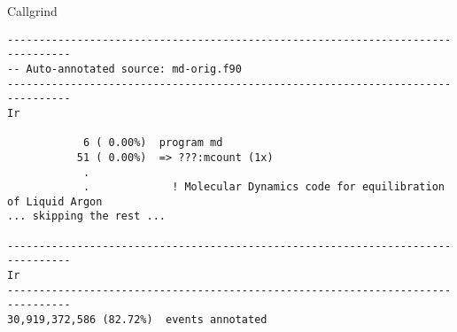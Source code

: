 \documentclass[10pt,t]{beamer}
\begin{document}
\begin{frame}{Callgrind}
\begin{itemize}
\begin{lstlisting}[basicstyle=\fontsize{4.5}{5.5}\selectfont\ttfamily]
--------------------------------------------------------------------------------
-- Auto-annotated source: md-orig.f90
--------------------------------------------------------------------------------
Ir

            6 ( 0.00%)  program md
           51 ( 0.00%)  => ???:mcount (1x)
            .
            .             ! Molecular Dynamics code for equilibration of Liquid Argon
... skipping the rest ...

--------------------------------------------------------------------------------
Ir
--------------------------------------------------------------------------------
30,919,372,586 (82.72%)  events annotated

        \end{lstlisting}
  \end{itemize}
\end{frame}
\end{document}
